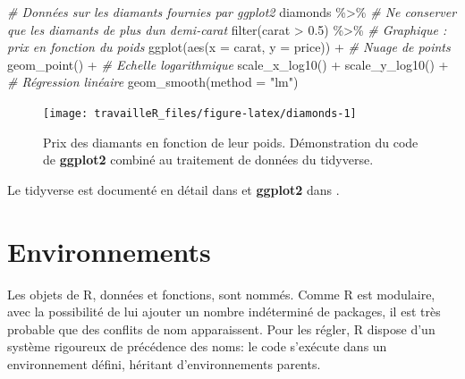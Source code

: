\documentclass[
  11pt,
  french,
  a4paper,
  extrafontsizes,onecolumn,openright
  ]{memoir}
\newenvironment{Shaded}{\begin{snugshade}}{\end{snugshade}}
\newcommand{\AttributeTok}[1]{\textcolor[rgb]{0.77,0.63,0.00}{#1}}
\newcommand{\CommentTok}[1]{\textcolor[rgb]{0.56,0.35,0.01}{\textit{#1}}}
\newcommand{\FloatTok}[1]{\textcolor[rgb]{0.00,0.00,0.81}{#1}}
\newcommand{\FunctionTok}[1]{\textcolor[rgb]{0.00,0.00,0.00}{#1}}
\newcommand{\NormalTok}[1]{#1}
\newcommand{\SpecialCharTok}[1]{\textcolor[rgb]{0.00,0.00,0.00}{#1}}
\newcommand{\StringTok}[1]{\textcolor[rgb]{0.31,0.60,0.02}{#1}}
\begin{document}
\begin{Shaded}
\begin{Highlighting}[]
\CommentTok{\# Données sur les diamants fournies par ggplot2}
\NormalTok{diamonds }\SpecialCharTok{\%\textgreater{}\%} 
  \CommentTok{\# Ne conserver que les diamants de plus d\textquotesingle{}un demi{-}carat}
  \FunctionTok{filter}\NormalTok{(carat }\SpecialCharTok{\textgreater{}} \FloatTok{0.5}\NormalTok{) }\SpecialCharTok{\%\textgreater{}\%} 
  \CommentTok{\# Graphique : prix en fonction du poids}
  \FunctionTok{ggplot}\NormalTok{(}\FunctionTok{aes}\NormalTok{(}\AttributeTok{x =}\NormalTok{ carat, }\AttributeTok{y =}\NormalTok{ price)) }\SpecialCharTok{+}
    \CommentTok{\# Nuage de points}
    \FunctionTok{geom\_point}\NormalTok{() }\SpecialCharTok{+} 
    \CommentTok{\# Echelle logarithmique}
    \FunctionTok{scale\_x\_log10}\NormalTok{() }\SpecialCharTok{+} 
    \FunctionTok{scale\_y\_log10}\NormalTok{() }\SpecialCharTok{+} 
    \CommentTok{\# Régression linéaire}
    \FunctionTok{geom\_smooth}\NormalTok{(}\AttributeTok{method =} \StringTok{"lm"}\NormalTok{)}
\end{Highlighting}
\end{Shaded}

\begin{figure}

{\centering \texttt{[image: travailleR\_files/figure-latex/diamonds-1]} 

}

\caption{Prix des diamants en fonction de leur poids. Démonstration du code de \textbf{ggplot2} combiné au traitement de données du tidyverse.}\label{fig:diamonds}
\end{figure}

\normalsize

Le tidyverse est documenté en détail dans \textcite{Wickham2016} et \textbf{ggplot2} dans \textcite{Wickham2017}.

\hypertarget{sec:environnements}{%
\section{Environnements}\label{sec:environnements}}

Les objets de R, données et fonctions, sont nommés.
Comme R est modulaire, avec la possibilité de lui ajouter un nombre indéterminé de packages, il est très probable que des conflits de nom apparaissent.
Pour les régler, R dispose d'un système rigoureux de précédence des noms: le code s'exécute dans un environnement défini, héritant d'environnements parents.
\end{document}
